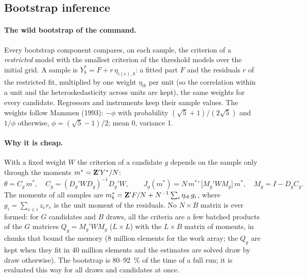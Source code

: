 \documentclass[
  10.5pt,
  a4paper,
]{article}
\begin{document}
\subsection{Bootstrap inference}\label{note:boot}

\paragraph{The wild bootstrap of the command.} Every bootstrap component compares, on each sample, the
criterion of a \emph{restricted} model with the smallest criterion of the threshold models over the
initial grid. A sample is $Y^*_b=F+r\,\eta_{i(e),b}$: a fitted part $F$ and the residuals $r$ of the
restricted fit, multiplied by one weight $\eta_{ib}$ per unit (so the correlation within a unit and
the heteroskedasticity across units are kept), the same weights for every candidate. Regressors and
instruments keep their sample values. The weights follow Mammen (1993): $-\phi$ with probability
$(\sqrt5+1)/(2\sqrt5)$ and $1/\phi$ otherwise, $\phi=(\sqrt5-1)/2$; mean 0, variance 1.

\paragraph{Why it is cheap.} With a fixed weight $W$ the criterion of a candidate $g$ depends on the
sample only through the moments $m^*=\mathbf{Z}'Y^*/N$:
\begin{equation}\label{eq:quad}
\theta=C_g\,m^*,\quad C_g=(D_g'WD_g)^{-1}D_g'W,\qquad
J_g(m^*)=N\,{m^*}'\,\bigl[M_g'WM_g\bigr]\,m^*,\quad M_g=I-D_gC_g .
\end{equation}
The moments of all samples are $m^*_b=\mathbf{Z}'F/N+N^{-1}\sum_i\eta_{ib}\,g_i$, where $g_i=\sum_{e\in i}z_er_e$
is the unit moment of the residuals. No $N\times B$ matrix is ever formed: for $G$ candidates and $B$
draws, all the criteria are a few batched products of the $G$ matrices
$Q_g=M_g'WM_g$ ($L\times L$) with the $L\times B$ matrix of moments, in chunks that bound the memory
(8 million elements for the work array; the $Q_g$ are kept when they fit in 40 million elements and
the estimates are solved draw by draw otherwise). The bootstrap is 80--92~\% of the time of a full
run; it is evaluated this way for all draws and candidates at once.
\end{document}
